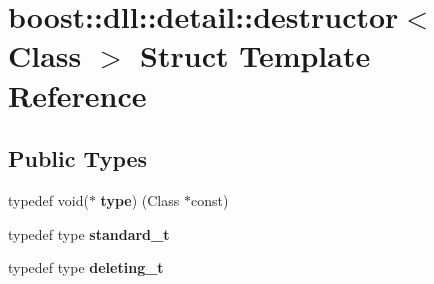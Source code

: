 \hypertarget{a00076}{}\section{boost\+:\+:dll\+:\+:detail\+:\+:destructor$<$ Class $>$ Struct Template Reference}
\label{a00076}
\subsection*{Public Types}
\begin{DoxyCompactItemize}
\item 
typedef void($\ast$ {\bfseries type}) (Class $\ast$const)\hypertarget{a00076_a155dbf742e9c6499f52041d0b9f061be}{}\label{a00076_a155dbf742e9c6499f52041d0b9f061be}

\item 
typedef type {\bfseries standard\+\_\+t}\hypertarget{a00076_a6a72bebfcaef05b746a9b4cf93d66c50}{}\label{a00076_a6a72bebfcaef05b746a9b4cf93d66c50}

\item 
typedef type {\bfseries deleting\+\_\+t}\hypertarget{a00076_aff7ad402a5e8d7c8d1d086f73f3acf88}{}\label{a00076_aff7ad402a5e8d7c8d1d086f73f3acf88}

\end{DoxyCompactItemize}
